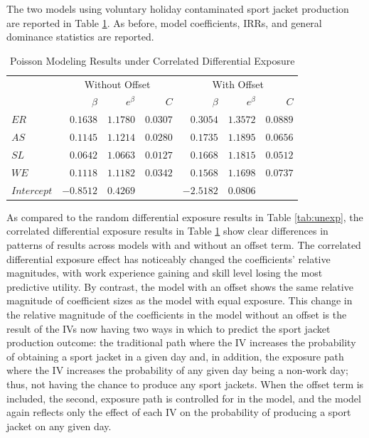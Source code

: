 \documentclass[ShortAfour,times,sageapa]{sagej}
\begin{document}
	The two models using voluntary holiday contaminated sport jacket production are reported in Table \ref{tab:exp}.
	As before, model coefficients, IRRs, and general dominance statistics are reported.
	
	\begin{table}[h!]
		\centering
		\caption{\centering Poisson Modeling Results under Correlated Differential Exposure}
		\begin{tabular}{l|rrrrrr}
			\toprule
			\multicolumn{1}{l}{} & \multicolumn{3}{c}{Without Offset} & \multicolumn{3}{c}{With Offset} \\ 
			\cmidrule(lr){2-4} \cmidrule(lr){5-7}
			\multicolumn{1}{l}{} & $\beta$ & $e^{\beta}$ & $C$ & $\beta$ & $e^{\beta}$ & $C$ \\ 
			\midrule
			$ER$ & $0.1638$ & $1.1780$ & $0.0307$ & $0.3054$ & $1.3572$ & $0.0889$ \\ 
			$AS$ & $0.1145$ & $1.1214$ & $0.0280$ & $0.1735$ & $1.1895$ & $0.0656$ \\ 
			$SL$ & $0.0642$ & $1.0663$ & $0.0127$ & $0.1668$ & $1.1815$ & $0.0512$ \\ 
			$WE$ & $0.1118$ & $1.1182$ & $0.0342$ & $0.1568$ & $1.1698$ & $0.0737$ \\ 
			$Intercept$ & $-0.8512$ & $0.4269$ & & $-2.5182$ & $0.0806$ & \\ 
			\bottomrule
		\end{tabular}
		\label{tab:exp}
	\end{table}
	
	As compared to the random differential exposure results in Table \ref{tab:unexp}, the correlated differential exposure results in Table \ref{tab:exp} show clear differences in patterns of results across models with and without an offset term.
	The correlated differential exposure effect has noticeably changed the coefficients' relative magnitudes, with work experience gaining and skill level losing the most predictive utility.
	By contrast, the model with an offset shows the same relative magnitude of coefficient sizes as the model with equal exposure.
	This change in the relative magnitude of the coefficients in the model without an offset is the result of the IVs now having two ways in which to predict the sport jacket production outcome: the traditional path where the IV increases the probability of obtaining a sport jacket in a given day and, in addition, the exposure path where the IV increases the probability of any given day being a non-work day; thus, not having the chance to produce any sport jackets.
	When the offset term is included, the second, exposure path is controlled for in the model, and the model again reflects only the effect of each IV on the probability of producing a sport jacket on any given day.
	
\end{document}
